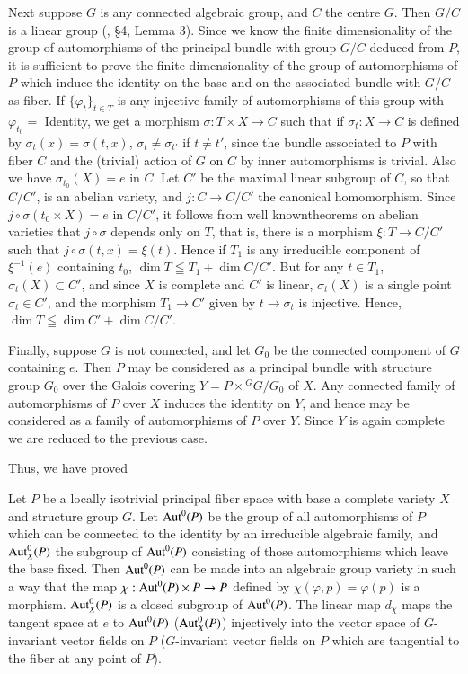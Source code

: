 Next suppose $G$ is any connected algebraic group, and $C$ the centre $G$. Then $G/C$ is a linear group (\cite{art6-key4}, \S 4, Lemma 3). Since we know the finite dimensionality of the group of automorphisms of the principal bundle with group $G/C$ deduced from $P$, it is sufficient to prove the finite dimensionality of the group of automorphisms of $P$ which induce the identity on the base and on the  associated bundle with $G/C$ as fiber. If $\{\varphi_t\}_{t \in T}$ is any injective family of automorphisms of this group with $\varphi_{t_0} = $ Identity, we get a morphism $\sigma : T \times X \to C$ such that if $\sigma_t : X \to C$ is defined by $\sigma_t (x) = \sigma (t, x)$, $\sigma_t \neq \sigma_{t'}$ if $t \neq t'$, since the bundle associated to $P$ with fiber $C$ and the (trivial) action of $G$ on $C$ by inner automorphisms is trivial. Also we have $\sigma_{t_0} (X) = e$ in $C$. Let $C'$ be the maximal linear subgroup of $C$, so that $C/C'$, is an abelian variety, and $j: C \to C/ C'$ the canonical homomorphism. Since $j \circ \sigma (t_0 \times X) = e$ in $C/C'$, it follows from well known\pageoriginale theorems on abelian varieties that $j \circ \sigma$ depends only on $T$, that is, there is a morphism $\xi: T \to C / C'$ such that  $j \circ \sigma (t, x) = \xi (t)$. Hence if $T_1$ is any irreducible component of $\xi^{-1} (e)$ containing $t_0$, $\dim T \leqq T_1 + \dim C/C'$. But for any $t \in T _1$, $\sigma_t (X) \subset C'$, and since $X$ is complete and $C'$ is linear, $\sigma_t (X)$ is a single point $\sigma_t \in C'$, and the morphism $T_1 \to C'$ given by $t \to \sigma_t$ is  injective. Hence, $\dim T \leqq \dim C' + \dim C/ C'$.

Finally, suppose $G$ is not connected, and let $G_0$ be the connected component of $G$ containing $e$. Then $P$  may be considered as a principal bundle with structure group $G_0$ over the Galois covering $Y = P \times {}^G G / G_0$ of $X$. Any connected family of automorphisms of $P$ over $X$ induces the identity on $Y$, and hence may be considered as a family of automorphisms of $P$ over $Y$. Since $Y$ is again complete we are reduced to the previous case.

Thus, we have proved

\begin{corollary}\label{art6-coro2} %
Let $P$ be a locally isotrivial principal fiber space with base a complete variety $X$ and structure group $G$. Let $\operatorname{Aut}^0 (P)$ be the group of all automorphisms of $P$ which can be connected to the identity by an irreducible algebraic family, and $\operatorname{Aut}^0_X(P)$ the subgroup of $\operatorname{Aut}^0(P)$ consisting of those automorphisms which leave the base fixed. Then $\operatorname{Aut}^0 (P)$ can be made into an algebraic group variety in such a way that the map $\chi: \operatorname{Aut}^0 (P) \times P \to P$ defined by $\chi (\varphi, p) = \varphi (p)$ is a morphism. $\operatorname{Aut}^0_X (P)$ is a closed subgroup of $\operatorname{Aut}^0 (P)$. The linear map $d_\chi$ maps the tangent space at $e$ to $\operatorname{Aut}^0 (P)$ (\resp $\operatorname{Aut}^0_X(P)$) injectively into the vector space of $G$-invariant vector fields on $P$ (\resp $G$-invariant vector fields on $P$ which are tangential to the fiber at any point of $P$).
\end{corollary}


